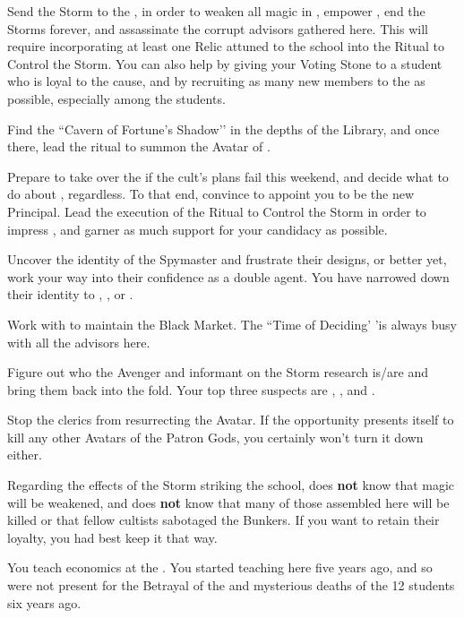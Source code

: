 \documentclass[char]{GL2020}
\begin{document}
\begin{itemz}
    \item Send the Storm to the \pSc{}, in order to weaken all magic in \pEarth{}, empower \cGenesis{}, end the Storms forever, and assassinate the corrupt advisors gathered here. This will require incorporating at least one Relic attuned to the school into the Ritual to Control the Storm. You can also help by giving your Voting Stone to a student who is loyal to the cause, and by recruiting as many new members to the \pGoaties{} as possible, especially among the students. 
    \item Find the ``Cavern of Fortune’s Shadow’’ in the depths of the Library, and once there, lead the ritual to summon the Avatar of \cGenesis{}. 
    \item Prepare to take over the \pGoaties{} if the cult’s plans fail this weekend, and decide what to do about \cChupLeader{}, regardless. To that end, convince \cPrincipal{} to appoint you to be the new Principal. Lead the execution of the Ritual to Control the Storm in order to impress \cPrincipal{\them}, and garner as much support for your candidacy as possible.
    \item Uncover the identity of the \pShippie{} Spymaster and frustrate their designs, or better yet, work your way into their confidence as a double agent. You have narrowed down their identity to \cJuniorStatesman{}, \cBunker{}, or \cEbbPriest{}.
    \item Work with \cChupInventor{} to maintain the Black Market. The ``Time of Deciding’ ’is always busy with all the advisors here.
    \item Figure out who the Avenger and informant on the Storm research is/are and bring them back into the fold. Your top three suspects are \cInterpol{}, \cChupAvenger{}, and \cWildCard{}.
    \item Stop the \pShip{} clerics from resurrecting the \cEbb{} Avatar. If the opportunity presents itself to kill any other Avatars of the Patron Gods, you certainly won't turn it down either. 
\end{itemz}

\begin{itemz}[Notes]
    \item Regarding the effects of the Storm striking the school, \cChupInventor{} does \textbf{not} know that magic will be weakened, and \cChupstudent{} does \textbf{not} know that many of those assembled here will be killed or that \cChupstudent{\their} fellow cultists sabotaged the Bunkers. If you want to retain their loyalty, you had best keep it that way.
    \item You teach economics at the \pSchool{}. You started teaching here five years ago, and so were not present for the Betrayal of the \pShip{} and mysterious deaths of the 12 students six years ago.
\end{itemz}
\end{document}
